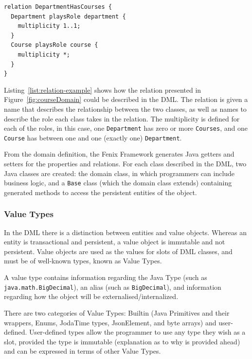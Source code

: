 \documentclass{llncs}
\begin{document}
\begin{lstlisting}[caption={DML for the relation between \texttt{Course}
    and \texttt{Department}},label={list:relation-example}]
relation DepartmentHasCourses {
  Department playsRole department {
    multiplicity 1..1;
  }
  Course playsRole course {
    multiplicity *;
  }
}
\end{lstlisting}

Listing~\ref{list:relation-example} shows how the relation presented
in Figure~\ref{fig:courseDomain} could be described in the DML. The
relation is given a name that describes the relationship between the
two classes, as well as names to describe the role each class takes in
the relation. The multiplicity is defined for each of the roles, in
this case, one \texttt{Department} has zero or more \texttt{Courses},
and one \texttt{Course} has between one and one (exactly one)
\texttt{Department}.


From the domain definition, the Fenix Framework generates Java getters
and setters for the properties and relations. For each class described
in the DML, two Java classes are created: the domain class, in which
programmers can include business logic, and a \texttt{Base} class
(which the domain class extends) containing generated methods to
access the persistent entities of the object.

\subsubsection{Value Types}

In the DML there is a distinction between entities and value
objects. Whereas an entity is transactional and persistent, a value
object is immutable and not persistent. Value objects are used as the
values for slots of DML classes, and must be of well-known types,
known as Value Types.

A value type contains information regarding the Java Type (such as
\texttt{java.math.BigDecimal}), an alias (such as
\texttt{BigDecimal}), and information regarding how the object will be
externalised/internalized.

There are two categories of Value Types: Builtin (Java Primitives and
their wrappers, Enums, JodaTime types, JsonElement, and byte arrays)
and user-defined. User-defined types allow the programmer to use any
type they wish as a slot, provided the type is immutable (explanation
as to why is provided ahead) and can be expressed in terms of other
Value Types.
\end{document}
